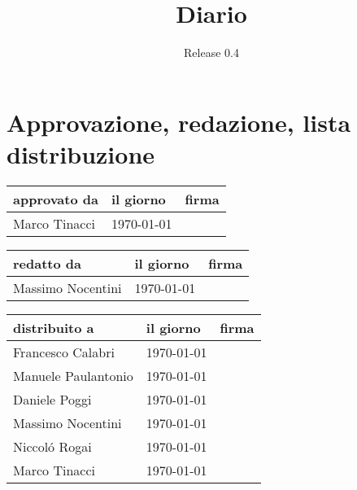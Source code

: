 \documentclass[a4paper, 12pt]{report}
\title{Diario}
\author{Release 0.4}
\date{\today \\Firenze \\\begin{figure}[h] \centering \texttt{[image: ../images/logokiwi.png]} \end{figure} }
\begin{document}
\maketitle

\section*{Approvazione, redazione, lista distribuzione}
\begin{table}[h!]
  \begin{center}
    \begin{tabular}{| l | l | p{60mm} |}
    \hline
    \textbf{approvato da} & \textbf{il giorno} & \textbf{firma} \\
	\hline    
	Marco Tinacci & \today &  \\
    \hline
    \end{tabular}
  \end{center}
\end{table}

\begin{table}[h!]
  \begin{center}
    \begin{tabular}{| l | l | p{60mm} |}
    \hline
    \textbf{redatto da} & \textbf{il giorno} & \textbf{firma} \\
	\hline    
	Massimo Nocentini & \today &  \\
    \hline
    \end{tabular}
  \end{center}
\end{table}

\begin{table}[h!]
  \begin{center}
    \begin{tabular}{| l | l | p{60mm} |}
    \hline
    \textbf{distribuito a} & \textbf{il giorno} & \textbf{firma} \\
	\hline    
	Francesco Calabri & \today &  \\
    \hline
	Manuele Paulantonio & \today &  \\
    \hline
	Daniele Poggi & \today &  \\
    \hline
	Massimo Nocentini & \today &  \\
    \hline
	Niccol\'o Rogai & \today &  \\
    \hline
	Marco Tinacci & \today &  \\
    \hline
    \end{tabular}
  \end{center}
\end{table}
\end{document}
